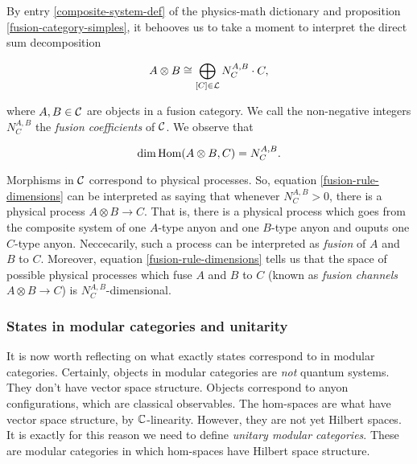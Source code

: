\begin{rem} By entry \ref{composite-system-def} of the physics-math dictionary and proposition \ref{fusion-category-simples}, it behooves us to take a moment to interpret the direct sum decomposition

\begin{equation}
A\otimes B \cong \bigoplus_{[C]\in {\mathcal L}}N^{A,B}_{C}\cdot C,
\end{equation}

where $A,B\in {\mathcal C}$ are objects in a fusion category. We call the non-negative integers $N^{A,B}_C$ the {\em fusion coefficients} of ${\mathcal C}$. We observe that

\begin{equation}\label{fusion-rule-dimensions}
\dim \operatorname{Hom}(A\otimes B, C)=N^{A,B}_C.
\end{equation}

Morphisms in ${\mathcal C}$ correspond to physical processes. So, equation \ref{fusion-rule-dimensions} can be interpreted as saying that whenever $N^{A,B}_{C}>0$, there is a physical process $A\otimes B\to C$. That is, there is a physical process which goes from the composite system of one $A$-type anyon and one $B$-type anyon and ouputs one $C$-type anyon. Neccecarily, such a process can be interpreted as {\em fusion} of $A$ and $B$ to $C$. Moreover, equation \ref{fusion-rule-dimensions} tells us that the space of possible physical processes which fuse $A$ and $B$ to $C$ (known as {\em fusion channels} $A\otimes B\to C$) is $N^{A,B}_C$-dimensional.
\end{rem}

\subsubsection{States in modular categories and unitarity}


It is now worth reflecting on what exactly states correspond to in modular categories. Certainly, objects in modular categories are \textit{not} quantum systems. They don't have vector space structure. Objects correspond to anyon configurations, which are classical observables. The hom-spaces are what have vector space structure, by ${\mathbb C}$-linearity. However, they are not yet Hilbert spaces. It is exactly for this reason we need to define {\em unitary modular categories}. These are modular categories in which hom-spaces have Hilbert space structure.

